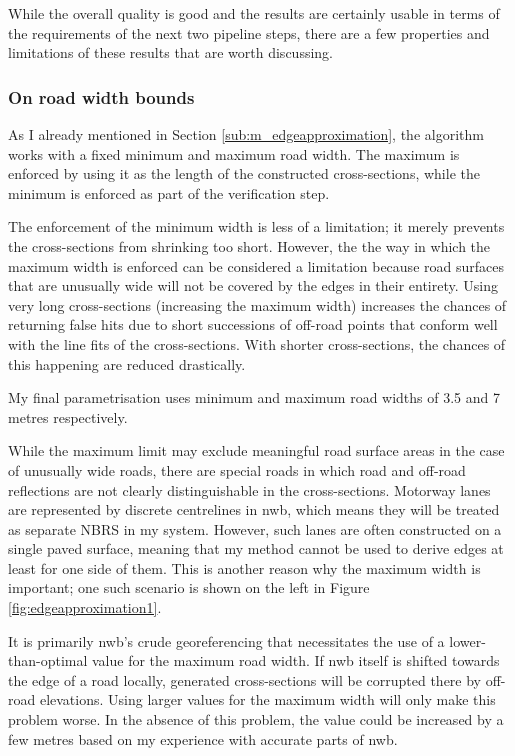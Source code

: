 While the overall quality is good and the results are certainly usable in terms of the requirements of the next two pipeline steps, there are a few properties and limitations of these results that are worth discussing.

\subsubsection{On road width bounds}

As I already mentioned in Section \ref{sub:m_edgeapproximation}, the algorithm works with a fixed minimum and maximum road width. The maximum is enforced by using it as the length of the constructed cross-sections, while the minimum is enforced as part of the verification step.

The enforcement of the minimum width is less of a limitation; it merely prevents the cross-sections from shrinking too short. However, the the way in which the maximum width is enforced can be considered a limitation because road surfaces that are unusually wide will not be covered by the edges in their entirety. Using very long cross-sections (increasing the maximum width) increases the chances of returning false hits due to short successions of off-road points that conform well with the line fits of the cross-sections. With shorter cross-sections, the chances of this happening are reduced drastically.

My final parametrisation uses minimum and maximum road widths of 3.5 and 7 metres respectively.

While the maximum limit may exclude meaningful road surface areas in the case of unusually wide roads, there are special roads in which road and off-road reflections are not clearly distinguishable in the cross-sections. Motorway lanes are represented by discrete centrelines in \ac{nwb}, which means they will be treated as separate NBRS in my system. However, such lanes are often constructed on a single paved surface, meaning that my method cannot be used to derive edges at least for one side of them. This is another reason why the maximum width is important; one such scenario is shown on the left in Figure \ref{fig:edgeapproximation1}.

It is primarily \ac{nwb}'s crude georeferencing that necessitates the use of a lower-than-optimal value for the maximum road width. If \ac{nwb} itself is shifted towards the edge of a road locally, generated cross-sections will be corrupted there by off-road elevations. Using larger values for the maximum width will only make this problem worse. In the absence of this problem, the value could be increased by a few metres based on my experience with accurate parts of \ac{nwb}.


